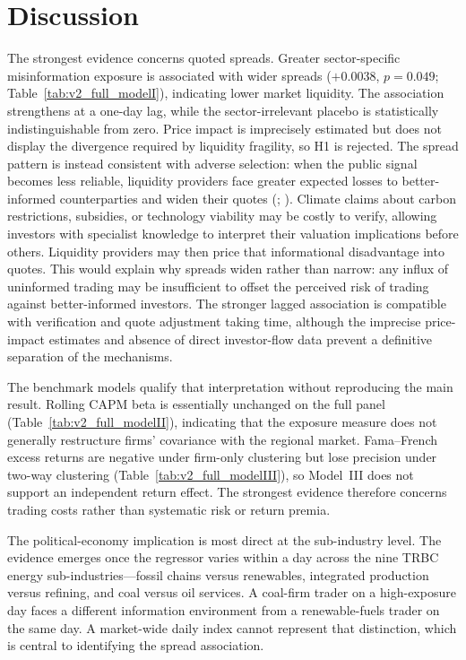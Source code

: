 \documentclass{article}
\theoremstyle{plain}
\begin{document}
\section{Discussion}
\label{sec:discussion}

The strongest evidence concerns quoted spreads. Greater sector-specific misinformation exposure is associated with wider spreads ($+0.0038$, $p=0.049$; Table~\ref{tab:v2_full_modelI}), indicating lower market liquidity. The association strengthens at a one-day lag, while the sector-irrelevant placebo is statistically indistinguishable from zero. Price impact is imprecisely estimated but does not display the divergence required by liquidity fragility, so H1 is rejected. The spread pattern is instead consistent with adverse selection: when the public signal becomes less reliable, liquidity providers face greater expected losses to better-informed counterparties and widen their quotes (\cite{GlostenMilgrom1985}; \cite{EasleyOHara1992}). Climate claims about carbon restrictions, subsidies, or technology viability may be costly to verify, allowing investors with specialist knowledge to interpret their valuation implications before others. Liquidity providers may then price that informational disadvantage into quotes. This would explain why spreads widen rather than narrow: any influx of uninformed trading may be insufficient to offset the perceived risk of trading against better-informed investors. The stronger lagged association is compatible with verification and quote adjustment taking time, although the imprecise price-impact estimates and absence of direct investor-flow data prevent a definitive separation of the mechanisms.

The benchmark models qualify that interpretation without reproducing the main result. Rolling CAPM beta is essentially unchanged on the full panel (Table~\ref{tab:v2_full_modelII}), indicating that the exposure measure does not generally restructure firms' covariance with the regional market. Fama--French excess returns are negative under firm-only clustering but lose precision under two-way clustering (Table~\ref{tab:v2_full_modelIII}), so Model~III does not support an independent return effect. The strongest evidence therefore concerns trading costs rather than systematic risk or return premia.

The political-economy implication is most direct at the sub-industry level. The evidence emerges once the regressor varies within a day across the nine TRBC energy sub-industries---fossil chains versus renewables, integrated production versus refining, and coal versus oil services. A coal-firm trader on a high-exposure day faces a different information environment from a renewable-fuels trader on the same day. A market-wide daily index cannot represent that distinction, which is central to identifying the spread association.
\end{document}
